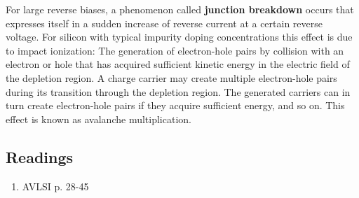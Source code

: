 \documentclass[main]{subfiles}
\begin{document}
For large reverse biases, a phenomenon called \textbf{junction breakdown} occurs that expresses itself in a sudden increase of reverse current at a certain reverse voltage. For silicon with typical impurity doping concentrations this effect is due to impact ionization: The generation of electron-hole pairs by collision with an electron or hole that has acquired sufficient kinetic energy in the electric field of the depletion region. A charge carrier may create multiple electron-hole pairs during its transition through the depletion region. The generated carriers can in turn create electron-hole pairs if they acquire sufficient energy, and so on. This effect is known as avalanche multiplication.


\subsection{Readings}
\begin{enumerate}
\item AVLSI p. 28-45
\end{enumerate}

\end{document}
